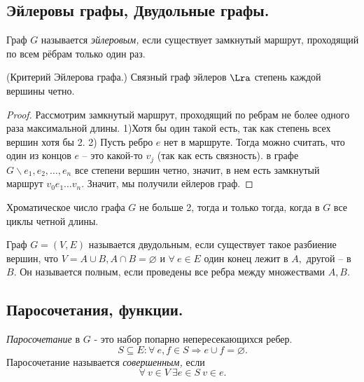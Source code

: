 

\subsection{Эйлеровы графы, Двудольные графы.}

\begin{definition}
    Граф $G$ называется \textit{эйлеровым,} если существует замкнутый маршрут, проходящий по всем рёбрам только один раз.
\end{definition}
\begin{theorem}(Критерий Эйлерова графа.)
Связный граф эйлеров $\Lra$ степень каждой вершины четно.
\end{theorem}

\begin{proof}
    Рассмотрим замкнутый маршрут, проходящий по ребрам не более одного раза максимальной длины. 1)Хотя бы один такой есть, так как степень всех вершин хотя бы 2. 2) Пусть ребро $e$ нет в маршруте. Тогда можно считать, что один из концов $e$ -- это какой-то $v_j$ (так как есть связность). в графе $G \backslash {e_1, e_2, \dots, e_n}$ все степени вершин четно, значит, в нем есть замкнутый маршрут $v_0e_1\dots v_n.$ Значит, мы получили ейлеров граф.
\end{proof}

\begin{lemma}
    Хроматическое число графа $G$ не больше 2, тогда и только тогда, когда в $G$ все циклы четной длины.
\end{lemma}

\begin{definition}
    Граф $G = (V, E)$ называется двудольным, если существует такое разбиение вершин, что $V = A \cup B, A \cap B = \varnothing$ и $\forall \ e \in E$ один конец лежит в $A,$ другой -- в $B.$ Он называется полным, если проведены все ребра между множествами $A, B.$
\end{definition}

\subsection{Паросочетания, функции.}

\begin{definition}
    \textit{Паросочетание} в $G$ - это набор попарно непересекающихся ребер. $$S \subseteq E: \forall \ e, f \in S \Longrightarrow e \cup f = \varnothing.$$ 
    Паросочетание называется \textit{совершенным,} если $$\forall \ v \in V  \ \exists e \in S \ v \in e.$$
\end{definition}

